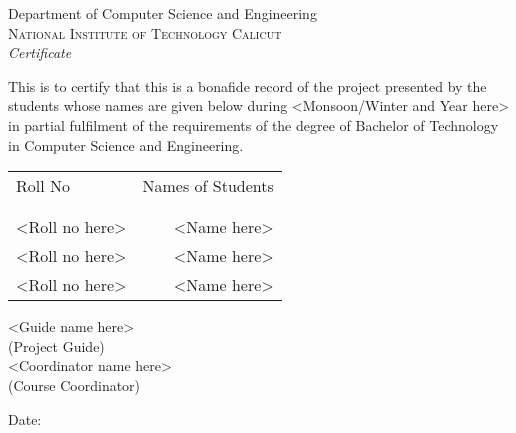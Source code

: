 \newpage
\thispagestyle{empty}

\begin{center}

\huge{Department of Computer Science and Engineering}\\[0.5cm]
\normalsize
\textsc{National Institute of Technology Calicut}\\[2.0cm]

\emph{\LARGE Certificate}\\[2.5cm]
\end{center}
\normalsize This is to certify that this is a bonafide record of the project presented by the students whose names are given below during <Monsoon/Winter and Year here> in partial fulfilment of the requirements of the degree of Bachelor of Technology in Computer Science and Engineering.\\[1.0cm]

\begin{table}[h]
\centering
\begin{tabular}{lr}
Roll No & Names of Students \\ \\ \hline
\\
<Roll no here> & <Name here> \\ 
<Roll no here> & <Name here> \\
<Roll no here> & <Name here> \\
\end{tabular}
\end{table}

\vfill


\begin{flushright}
<Guide name here>\\
(Project Guide)\\[1.5cm]
<Coordinator name here>\\
(Course Coordinator)\\
\end{flushright}

\begin{flushleft}
Date:
\end{flushleft}
